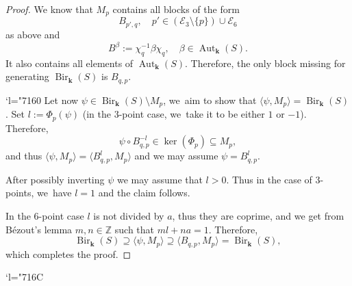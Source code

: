 \documentclass[JEP,XML,SOM,Unicode,NoFloatCountersInSection, NoEqCountersInSection,published]{cedram}
\newcommand{\Changel}{\mathcode`l="7160}
\newcommand{\Changelback}{\mathcode`l="716C}
\theoremstyle{definition}
\newcommand{\kk}{{\boldsymbol{k}}}
\DeclareMathOperator{\Bir}{Bir}
\DeclareMathOperator{\Aut}{Aut}
\begin{document}
\begin{proof}
We know that $M_p$ contains all blocks of the form
\[
B_{p',q}, \quad p' \in (\mathcal{E}_3 \setminus \{ p\})\cup \mathcal{E}_6
\]
as above and
\[
B^{\beta} := \chi_q^{-1} \beta \chi_q, \quad\beta \in \Aut_{\kk}(S).
\]
It also contains all elements of $\Aut_{\kk}(S)$. Therefore, the only block missing for generating $\Bir_{\kk}(S)$ is $B_{q,p}$.

\Changel
Let now $\psi \in \Bir_{\kk}(S) \setminus M_p$, we~aim to show that $\langle \psi, M_p \rangle = \Bir_{\kk}(S)$. Set $l:= \Phi_p(\psi)$ (in the $3$\nobreakdash-point case, we~take it to be either $1$ or $-1$). Therefore,
\[
\psi \circ B_{q,p}^{-l} \in \ker(\Phi_p) \subseteq M_p,
\]
and thus $\langle \psi , M_p \rangle = \langle B_{q,p}^l,M_p \rangle$ and we may assume $\psi = B_{q,p}^l$.

After possibly inverting $\psi$ we may assume that $l > 0$. Thus in the case of $3$\nobreakdash-points, we~have $l=1$ and the claim follows.

In the $6$\nobreakdash-point case $l$ is not divided by $a$, thus they are coprime, and we get from Bézout's lemma $m,n \in \mathbb{Z}$ such that $ml + na = 1$. Therefore,
\[
\Bir_{\kk}(S) \supseteq \langle \psi,M_p \rangle \supseteq \langle B_{q,p},M_p \rangle = \Bir_{\kk}(S),
\]
which completes the proof.
\end{proof}

\Changelback

\backmatter


\end{document}
